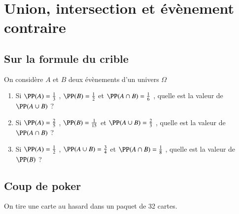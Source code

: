 \documentclass[oneside,12pt]{article}          %
\begin{document}
\section{Union, intersection et évènement contraire}

\subsection{Sur la formule du crible}
On considère $A$ et $B$ deux évènements d'un univers $\Omega$
\begin{enumerate} \setlength{\itemsep}{1mm}
	\item Si $\PP(A)=\frac{1}{3}$ , $\PP(B)=\frac{1}{2}$ et $\PP(A \cap B)=\frac{1}{6}$ , quelle est la valeur de $\PP(A \cup B)$ ?
	\item Si $\PP(A)=\frac{2}{5}$ , $\PP(B)=\frac{1}{15}$ et $\PP(A \cup B)=\frac{2}{3}$ , quelle est la valeur de $\PP(A \cap B)$ ?
	\item Si $\PP(A)=\frac{1}{2}$ , $\PP(A \cup B)=\frac{3}{4}$ et $\PP(A \cap B)=\frac{1}{8}$ , quelle est la valeur de $\PP(B)$ ?
\end{enumerate}



\subsection{Coup de poker}
On tire une carte au hasard dans un paquet de 32 cartes.
\end{document}
